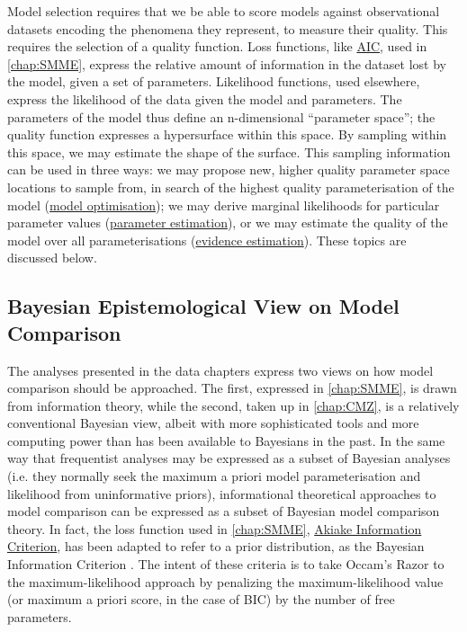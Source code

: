 Model selection requires that we be able to score models against observational datasets encoding the phenomena they represent, to measure their quality. This requires the selection of a quality function. Loss functions, like \hyperref[AIC]{AIC}, used in \autoref{chap:SMME}, express the relative amount of information in the dataset lost by the model, given a set of parameters. Likelihood functions, used elsewhere, express the likelihood of the data given the model and parameters. The parameters of the model thus define an n-dimensional ``parameter space''; the quality function expresses a hypersurface within this space. By sampling within this space, we may estimate the shape of the surface. This sampling information can be used in three ways: we may propose new, higher quality parameter space locations to sample from, in search of the highest quality parameterisation of the model (\hyperref[opt]{model optimisation}); we may derive marginal likelihoods for particular parameter values (\hyperref[est]{parameter estimation}), or we may estimate the quality of the model over all parameterisations (\hyperref[evi]{evidence estimation}). These topics are discussed below.

\subsection{Bayesian Epistemological View on Model Comparison}
\label{ssec:BayesEpistemology}
The analyses presented in the data chapters express two views on how model comparison should be approached. The first, expressed in \autoref{chap:SMME}, is drawn from information theory, while the second, taken up in \autoref{chap:CMZ}, is a relatively conventional Bayesian view, albeit with more sophisticated tools and more computing power than has been available to Bayesians in the past. In the same way that frequentist analyses may be expressed as a subset of Bayesian analyses (i.e. they normally seek the maximum a priori model parameterisation and likelihood from uninformative priors), informational theoretical approaches to model comparison can be expressed as a subset of Bayesian model comparison theory. In fact, the loss function used in \autoref{chap:SMME}, \hyperref[AIC]{Akiake Information Criterion}, has been adapted to refer to a prior distribution, as the Bayesian Information Criterion \cite{Posada2004}. The intent of these criteria is to take Occam's Razor to the maximum-likelihood approach by penalizing the maximum-likelihood value (or maximum a priori score, in the case of BIC) by the number of free parameters.

